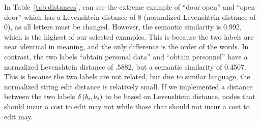 In Table~\ref{tab:distances}, can see the extreme example of ``door open'' and ``open door'' which has a Levenshtein distance of 8 (normalized Levenshtein distance of 0), as all letters must be changed. However, the semantic similarity is 0.992, which is the highest of our selected examples. This is because the two labels are near identical in meaning, and the only difference is the order of the words. In contrast, the two labels ``obtain personal data'' and ``obtain personnel'' have a normalized Levenshtein distance of .5882, but a semantic similarity of 0.4507. This is because the two labels are not related, but due to similar language, the normalized string edit distance is relatively small. If we implemented a distance between the two labels
$\delta\left(\ATlabel{d}{i}, \ATlabel{e}{j}\right)$ %
to be based on Levenshtein distance, nodes that should incur a cost to edit may not while those that should not incur a cost to edit may.

